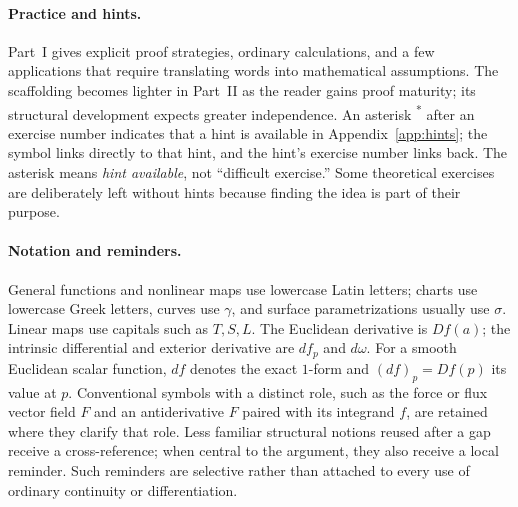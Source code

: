 \paragraph{Practice and hints.}
Part~I gives explicit proof strategies, ordinary calculations, and a few
applications that require translating words into mathematical assumptions.
The scaffolding becomes lighter in Part~II as the reader gains proof
maturity; its structural development expects greater independence.
An asterisk \textsuperscript{*} after an exercise number indicates that
a hint is available in Appendix~\ref{app:hints}; the symbol links directly
to that hint, and the hint's exercise number links back. The asterisk means
\emph{hint available}, not ``difficult exercise.'' Some theoretical exercises
are deliberately left without hints because finding the idea is part of
their purpose.

\paragraph{Notation and reminders.}
General functions and nonlinear maps use lowercase Latin letters; charts
use lowercase Greek letters, curves use $\gamma$, and surface
parametrizations usually use $\sigma$. Linear maps use capitals such as
$T,S,L$. The Euclidean derivative is $Df(a)$; the intrinsic differential
and exterior derivative are $df_p$ and $d\omega$. For a smooth Euclidean
scalar function, $df$ denotes the exact $1$-form and $(df)_p=Df(p)$
its value at $p$. Conventional symbols
with a distinct role, such as the force or flux vector field $F$ and an
antiderivative $F$ paired with its integrand $f$, are retained where they
clarify that role. Less familiar structural notions reused after a gap
receive a cross-reference; when central to the argument, they also receive
a local reminder. Such reminders are selective rather than attached to
every use of ordinary continuity or differentiation.


